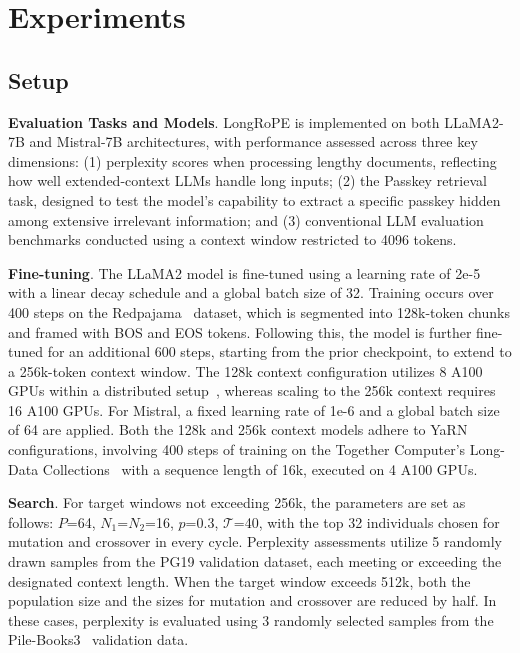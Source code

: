  \section{Experiments}

\label{sec:exp}
\subsection{Setup}
\textbf{Evaluation Tasks and Models}. LongRoPE is implemented on both LLaMA2-7B and Mistral-7B architectures, with performance assessed across three key dimensions: (1) perplexity scores when processing lengthy documents, reflecting how well extended-context LLMs handle long inputs; (2) the Passkey retrieval task, designed to test the model’s capability to extract a specific passkey hidden among extensive irrelevant information; and (3) conventional LLM evaluation benchmarks conducted using a context window restricted to 4096 tokens.

\textbf{Fine-tuning}. The LLaMA2 model is fine-tuned using a learning rate of 2e-5 with a linear decay schedule and a global batch size of 32. Training occurs over 400 steps on the Redpajama~\cite{redpajama} dataset, which is segmented into 128k-token chunks and framed with BOS and EOS tokens. Following this, the model is further fine-tuned for an additional 600 steps, starting from the prior checkpoint, to extend to a 256k-token context window. The 128k context configuration utilizes 8 A100 GPUs within a distributed setup~\cite{cube}, whereas scaling to the 256k context requires 16 A100 GPUs. For Mistral, a fixed learning rate of 1e-6 and a global batch size of 64 are applied. Both the 128k and 256k context models adhere to YaRN~\cite{yarn} configurations, involving 400 steps of training on the Together Computer's Long-Data Collections~\cite{mistraldata} with a sequence length of 16k, executed on 4 A100 GPUs.

\textbf{Search}. For target windows not exceeding 256k, the parameters are set as follows: $P$=64, $N_1$=$N_2$=16, $p$=0.3, $\mathcal{T}$=40, with the top 32 individuals chosen for mutation and crossover in every cycle. Perplexity assessments utilize 5 randomly drawn samples from the PG19 validation dataset, each meeting or exceeding the designated context length. When the target window exceeds 512k, both the population size and the sizes for mutation and crossover are reduced by half. In these cases, perplexity is evaluated using 3 randomly selected samples from the Pile-Books3~\cite{pile} validation data.

